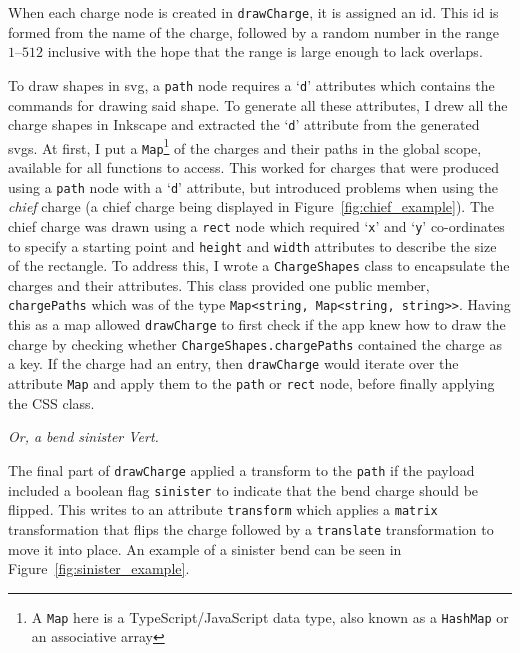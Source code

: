 \documentclass[nobib, a4paper, twoside, justified]{tufte-book}
\makeatletter
\newcommand{\svg}{\gls{svg}\@\xspace}
\newcommand{\svgs}{\glspl{svg}\@\xspace}
\newcommand{\charge}{\gls{charge}\@\xspace}
\newcommand{\charges}{\glspl{charge}\@\xspace}
\newcommand{\payload}{\gls{payload}\@\xspace}
\makeatother
\begin{document}
When each \charge{} node is created in \texttt{drawCharge}, it is assigned an id. This id is formed
from the name of the charge, followed by a random number in the range $1\text{--}512$ inclusive
with the hope that the range is large enough to lack overlaps.

To draw shapes in \svg{}, a \texttt{path} node requires a `\texttt{d}' attributes which contains
the commands for drawing said shape. To generate all these attributes, I drew all the \charge{}
shapes in Inkscape and extracted the `\texttt{d}' attribute from the generated \svgs{}. At first, I
put a \texttt{Map}\footnote{A \texttt{Map} here is a TypeScript/JavaScript data type, also known as
a \texttt{HashMap} or an associative array} of the \charges{} and their paths in the global scope,
available for all functions to access. This worked for \charges{} that were produced using a
\texttt{path} node with a `\texttt{d}' attribute, but introduced problems when using the
\textit{chief} \charge{} (a chief \charge{} being displayed in Figure~\ref{fig:chief_example}). The
chief \charge{} was drawn using a \texttt{rect} node which required `\texttt{x}' and `\texttt{y}'
co-ordinates to specify a starting point and \texttt{height} and \texttt{width} attributes to
describe the size of the rectangle. To address this, I wrote a \texttt{ChargeShapes} class to
encapsulate the \charges{} and their attributes. This class provided one public member,
\texttt{chargePaths} which was of the type \texttt{Map<string, Map<string, string>\hphantom{}>}.
Having this as a map allowed \texttt{drawCharge} to first check if the app knew how to draw the
\charge{} by checking whether \texttt{ChargeShapes.chargePaths} contained the \charge{} as a key.
If the \charge{} had an entry, then \texttt{drawCharge} would iterate over the attribute
\texttt{Map} and apply them to the \texttt{path} or \texttt{rect} node, before finally applying the
CSS class.

\begin{marginfigure}
  \centering
  \def\svgwidth{0.8\linewidth}
  
  \caption{\textit{Or, a bend sinister Vert.}}\label{fig:sinister_example}
\end{marginfigure}

The final part of \texttt{drawCharge} applied a transform to the \texttt{path} if the \payload
included a boolean flag \texttt{sinister} to indicate that the bend \charge{} should be flipped.
This writes to an attribute \texttt{transform} which applies a \texttt{matrix} transformation that
flips the \charge{} followed by a \texttt{translate} transformation to move it into place. An
example of a sinister bend can be seen in Figure~\ref{fig:sinister_example}.
\end{document}
